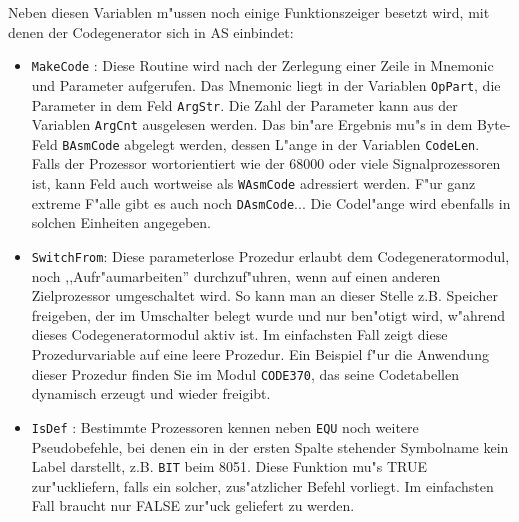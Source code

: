 \documentclass[12pt,a4paper,twoside]{report}
\newcommand{\tty}[1]{{\tt #1}}
\newcommand{\asname}{AS}
\begin{document}
Neben diesen Variablen m"ussen noch einige Funktionszeiger besetzt wird,
mit denen der Codegenerator sich in \asname{} einbindet:
\begin{itemize}
\item{\tty{MakeCode} : Diese Routine wird nach der Zerlegung einer Zeile
      in Mnemonic und Parameter aufgerufen.  Das Mnemonic liegt in der
      Variablen \tty{OpPart}, die Parameter in dem Feld \tty{ArgStr}.
      Die Zahl der Parameter kann aus der Variablen \tty{ArgCnt} ausgelesen
      werden.  Das bin"are Ergebnis mu"s in dem Byte-Feld \tty{BAsmCode}
      abgelegt werden, dessen L"ange in der Variablen \tty{CodeLen}.  Falls
      der Prozessor wortorientiert wie der 68000 oder viele Signalprozessoren
      ist, kann Feld auch wortweise als \tty{WAsmCode} adressiert werden.
      F"ur ganz extreme F"alle gibt es auch noch \tty{DAsmCode}... Die
      Codel"ange wird ebenfalls in solchen Einheiten angegeben.}
\item{\tty{SwitchFrom}: Diese parameterlose Prozedur erlaubt dem
      Codegeneratormodul, noch ,,Aufr"aumarbeiten'' durchzuf"uhren,
      wenn auf einen anderen Zielprozessor umgeschaltet wird.  So
      kann man an dieser Stelle z.B. Speicher freigeben, der im
      Umschalter belegt wurde und nur ben"otigt wird, w"ahrend dieses
      Codegeneratormodul aktiv ist.  Im einfachsten Fall zeigt diese
      Prozedurvariable auf eine leere Prozedur.  Ein Beispiel f"ur die
      Anwendung dieser Prozedur finden Sie im Modul \tty{CODE370}, das
      seine Codetabellen dynamisch erzeugt und wieder freigibt.}
\item{\tty{IsDef} : Bestimmte Prozessoren kennen neben \tty{EQU} noch weitere
      Pseudobefehle, bei denen ein in der ersten Spalte stehender
      Symbolname kein Label darstellt, z.B. \tty{BIT} beim 8051.  Diese
      Funktion mu"s TRUE zur"uckliefern, falls ein solcher, zus"atzlicher
      Befehl vorliegt.  Im einfachsten Fall braucht nur FALSE
      zur"uck geliefert zu werden.}
\end{itemize}
\end{document}
